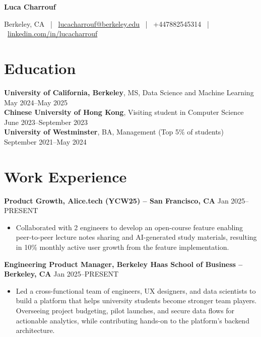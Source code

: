 \documentclass{article}
\begin{document}
\begin{center}
\textbf{\Large Luca Charrouf}

Berkeley, CA \ | \ \href{mailto:lucacharrouf@berkeley.edu}{lucacharrouf@berkeley.edu} \ | \ +447882545314 \ | \ \href{https://linkedin.com/in/lucacharrouf}{linkedin.com/in/lucacharrouf}
\end{center}

\section*{Education}
\textbf{University of California, Berkeley}, MS, Data Science and Machine Learning \hfill May 2024--May 2025\\
\textbf{Chinese University of Hong Kong}, Visiting student in Computer Science \hfill June 2023--September 2023\\
\textbf{University of Westminster}, BA, Management (Top 5\% of students) \hfill September 2021--May 2024

\section*{Work Experience}
\textbf{Product Growth, Alice.tech (YCW25) -- San Francisco, CA} \hfill Jan 2025--PRESENT
\begin{itemize}[leftmargin=*,noitemsep,topsep=0pt]
    \item Collaborated with 2 engineers to develop an open-course feature enabling peer-to-peer lecture notes sharing and AI-generated study materials, resulting in 10\% monthly active user growth from the feature implementation.
\end{itemize}

\textbf{Engineering Product Manager, Berkeley Haas School of Business -- Berkeley, CA} \hfill Jan 2025--PRESENT
\begin{itemize}[leftmargin=*,noitemsep,topsep=0pt]
    \item Led a cross-functional team of engineers, UX designers, and data scientists to build a platform that helps university students become stronger team players. Overseeing project budgeting, pilot launches, and secure data flows for actionable analytics, while contributing hands-on to the platform's backend architecture.
\end{itemize}
\end{document}
